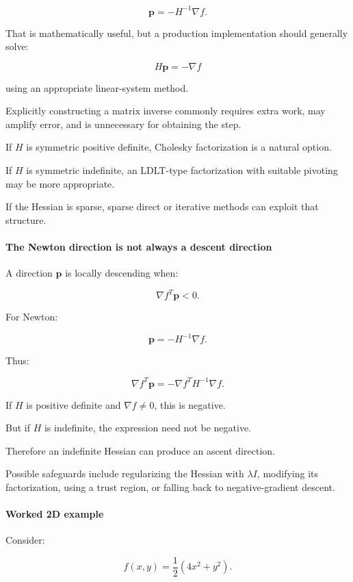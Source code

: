 \[
\mathbf p=-H^{-1}\nabla f.
\]

That is mathematically useful, but a production implementation should generally solve:

\[
H\mathbf p=-\nabla f
\]

using an appropriate linear-system method.

Explicitly constructing a matrix inverse commonly requires extra work, may amplify error, and is unnecessary for obtaining the step.

If \(H\) is symmetric positive definite, Cholesky factorization is a natural option.

If \(H\) is symmetric indefinite, an LDLT-type factorization with suitable pivoting may be more appropriate.

If the Hessian is sparse, sparse direct or iterative methods can exploit that structure.

\paragraph{The Newton direction is not always a descent direction}\label{02-foundations-ii-ch026-the-newton-direction-is-not-always-a-descent-direction}

A direction \(\mathbf p\) is locally descending when:

\[
\nabla f^T\mathbf p<0.
\]

For Newton:

\[
\mathbf p=-H^{-1}\nabla f.
\]

Thus:

\[
\nabla f^T\mathbf p = -\nabla f^TH^{-1}\nabla f.
\]

If \(H\) is positive definite and \(\nabla f\ne0\), this is negative.

But if \(H\) is indefinite, the expression need not be negative.

Therefore an indefinite Hessian can produce an ascent direction.

Possible safeguards include regularizing the Hessian with \(\lambda I\), modifying its factorization, using a trust region, or falling back to negative-gradient descent.

\paragraph{Worked 2D example}\label{02-foundations-ii-ch026-worked-2d-example}

Consider:

\[
f(x,y)=\frac12(4x^2+y^2).
\]


